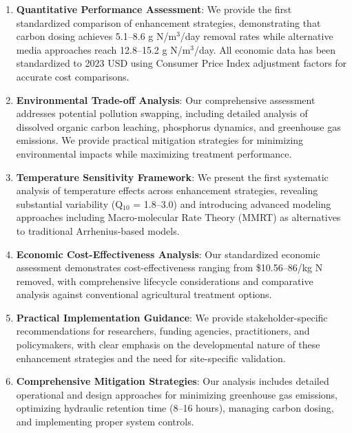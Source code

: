 \documentclass[12pt,a4paper]{article}
\begin{document}
\begin{enumerate}[leftmargin=*]

\item \textbf{Quantitative Performance Assessment}: We provide the first standardized comparison of enhancement strategies, demonstrating that carbon dosing achieves 5.1--8.6 g N/m$^3$/day removal rates while alternative media approaches reach 12.8--15.2 g N/m$^3$/day. All economic data has been standardized to 2023 USD using Consumer Price Index adjustment factors for accurate cost comparisons.

\item \textbf{Environmental Trade-off Analysis}: Our comprehensive assessment addresses potential pollution swapping, including detailed analysis of dissolved organic carbon leaching, phosphorus dynamics, and greenhouse gas emissions. We provide practical mitigation strategies for minimizing environmental impacts while maximizing treatment performance.

\item \textbf{Temperature Sensitivity Framework}: We present the first systematic analysis of temperature effects across enhancement strategies, revealing substantial variability (Q$_{10}$ = 1.8--3.0) and introducing advanced modeling approaches including Macro-molecular Rate Theory (MMRT) as alternatives to traditional Arrhenius-based models.

\item \textbf{Economic Cost-Effectiveness Analysis}: Our standardized economic assessment demonstrates cost-effectiveness ranging from \$10.56--86/kg N removed, with comprehensive lifecycle considerations and comparative analysis against conventional agricultural treatment options.

\item \textbf{Practical Implementation Guidance}: We provide stakeholder-specific recommendations for researchers, funding agencies, practitioners, and policymakers, with clear emphasis on the developmental nature of these enhancement strategies and the need for site-specific validation.

\item \textbf{Comprehensive Mitigation Strategies}: Our analysis includes detailed operational and design approaches for minimizing greenhouse gas emissions, optimizing hydraulic retention time (8--16 hours), managing carbon dosing, and implementing proper system controls.

\end{enumerate}
\end{document}
